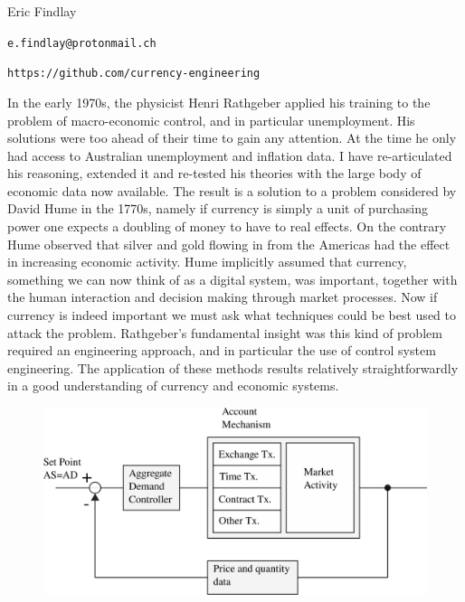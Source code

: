 \documentclass[a4paper]{article}
\begin{document}
    Eric Findlay

    \verb|e.findlay@protonmail.ch|

    \verb|https://github.com/currency-engineering|

    In the early 1970s, the physicist Henri Rathgeber applied his training to the problem
    of macro-economic control, and in particular unemployment. His solutions were too ahead of their
    time to gain any attention. At the time he only had access to Australian unemployment and
    inflation data. I have re-articulated his reasoning, extended it and re-tested his theories with
    the large body of economic data now available. The result is a solution to a problem considered
    by David Hume in the 1770s, namely if currency is simply a unit of purchasing power one expects
    a doubling of money to have to real effects. On the contrary Hume observed that silver and gold
    flowing in from the Americas had the effect in increasing economic activity. Hume implicitly
    assumed that currency, something we can now think of as a digital system, was important, together
    with the human interaction and decision making through market processes. Now if currency is
    indeed important we must ask what techniques could be best used to attack the problem.
    Rathgeber's fundamental insight was this kind of problem required an engineering approach, and
    in particular the use of control system engineering. The application of these methods results
    relatively straightforwardly in a good understanding of currency and economic systems.

    \begin{figure}[H]
    \centering
    \includegraphics[scale=0.50]{economic_feedback_schema}
    \end{figure}
\end{document}
